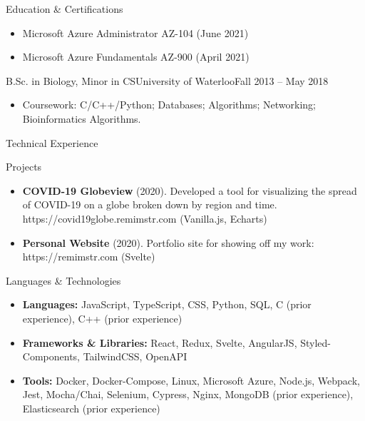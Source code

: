 \documentclass[]{mcdowellcv}
\begin{document}
	\begin{cvsection}{Education \& Certifications}
		\begin{cvsubsection}{}{}{}
			\begin{itemize}
			    \item Microsoft Azure Administrator AZ-104 (June 2021)
				\item Microsoft Azure Fundamentals AZ-900 (April 2021)
			\end{itemize}
		\end{cvsubsection}
		\begin{cvsubsection}{B.Sc. in Biology, Minor in CS}{University of Waterloo}{Fall 2013 -- May 2018}
			\begin{itemize}
				\item Coursework: C/C++/Python; Databases; Algorithms; Networking; Bioinformatics Algorithms.
			\end{itemize}
		\end{cvsubsection}
	\end{cvsection}

	\begin{cvsection}{Technical Experience}
		\begin{cvsubsection}{Projects}{}{}
			\begin{itemize}
				\item \textbf{COVID-19 Globeview} (2020). Developed a tool for visualizing the spread of COVID-19 on a globe broken down by region and time.
					https://covid19globe.remimstr.com (Vanilla.js, Echarts)
				\item \textbf{Personal Website} (2020). Portfolio site for showing off my work: https://remimstr.com (Svelte)
			\end{itemize}
		\end{cvsubsection}
	\end{cvsection}

	\begin{cvsection}{Languages \& Technologies}
		\begin{cvsubsection}{}{}{}
			\begin{itemize}
				\item \textbf{Languages:} JavaScript, TypeScript, CSS, Python, SQL, C (prior experience), C++ (prior experience)
				\item \textbf{Frameworks \& Libraries:} React, Redux, Svelte, AngularJS, Styled-Components, TailwindCSS, OpenAPI
				\item \textbf{Tools:} Docker, Docker-Compose, Linux, Microsoft Azure, Node.js, Webpack, Jest, Mocha/Chai, Selenium, Cypress, Nginx, MongoDB (prior experience), Elasticsearch (prior experience)
			\end{itemize}
		\end{cvsubsection}
	\end{cvsection}
\end{document}

